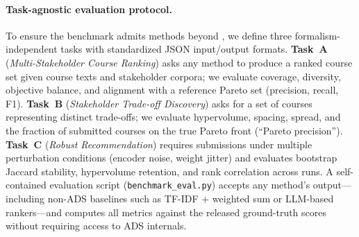 
\paragraph{Task-agnostic evaluation protocol.}
To ensure the benchmark admits methods beyond \ADS, we define three
formalism-independent tasks with standardized JSON input/output formats.
\textbf{Task~A} (\emph{Multi-Stakeholder Course Ranking}) asks any method to
produce a ranked course set given course texts and stakeholder corpora; we
evaluate coverage, diversity, objective balance, and alignment with a
reference Pareto set (precision, recall, F1).
\textbf{Task~B} (\emph{Stakeholder Trade-off Discovery}) asks for a set of
courses representing distinct trade-offs; we evaluate hypervolume, spacing,
spread, and the fraction of submitted courses on the true Pareto front
(``Pareto precision'').
\textbf{Task~C} (\emph{Robust Recommendation}) requires submissions under
multiple perturbation conditions (encoder noise, weight jitter) and evaluates
bootstrap Jaccard stability, hypervolume retention, and rank correlation across
runs.
A self-contained evaluation script
(\texttt{benchmark\_eval.py}) accepts any method's output---including non-ADS
baselines such as TF-IDF + weighted sum or LLM-based rankers---and computes all
metrics against the released ground-truth scores without requiring access to ADS
internals.

